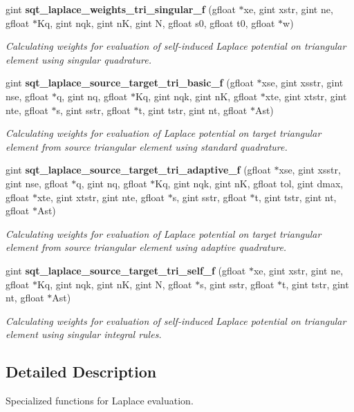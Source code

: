 \begin{DoxyCompactItemize}
gint {\bf sqt\+\_\+laplace\+\_\+weights\+\_\+tri\+\_\+singular\+\_\+f} (gfloat $\ast$xe, gint xstr, gint ne, gfloat $\ast$Kq, gint nqk, gint n\+K, gint N, gfloat s0, gfloat t0, gfloat $\ast$w)
\begin{DoxyCompactList}\small\item\em Calculating weights for evaluation of self-\/induced Laplace potential on triangular element using singular quadrature. \end{DoxyCompactList}\item 
gint {\bf sqt\+\_\+laplace\+\_\+source\+\_\+target\+\_\+tri\+\_\+basic\+\_\+f} (gfloat $\ast$xse, gint xsstr, gint nse, gfloat $\ast$q, gint nq, gfloat $\ast$Kq, gint nqk, gint n\+K, gfloat $\ast$xte, gint xtstr, gint nte, gfloat $\ast$s, gint sstr, gfloat $\ast$t, gint tstr, gint nt, gfloat $\ast$Ast)
\begin{DoxyCompactList}\small\item\em Calculating weights for evaluation of Laplace potential on target triangular element from source triangular element using standard quadrature. \end{DoxyCompactList}\item 
gint {\bf sqt\+\_\+laplace\+\_\+source\+\_\+target\+\_\+tri\+\_\+adaptive\+\_\+f} (gfloat $\ast$xse, gint xsstr, gint nse, gfloat $\ast$q, gint nq, gfloat $\ast$Kq, gint nqk, gint n\+K, gfloat tol, gint dmax, gfloat $\ast$xte, gint xtstr, gint nte, gfloat $\ast$s, gint sstr, gfloat $\ast$t, gint tstr, gint nt, gfloat $\ast$Ast)
\begin{DoxyCompactList}\small\item\em Calculating weights for evaluation of Laplace potential on target triangular element from source triangular element using adaptive quadrature. \end{DoxyCompactList}\item 
gint {\bf sqt\+\_\+laplace\+\_\+source\+\_\+target\+\_\+tri\+\_\+self\+\_\+f} (gfloat $\ast$xe, gint xstr, gint ne, gfloat $\ast$Kq, gint nqk, gint n\+K, gint N, gfloat $\ast$s, gint sstr, gfloat $\ast$t, gint tstr, gint nt, gfloat $\ast$Ast)
\begin{DoxyCompactList}\small\item\em Calculating weights for evaluation of self-\/induced Laplace potential on triangular element using singular integral rules. \end{DoxyCompactList}\end{DoxyCompactItemize}


\subsection{Detailed Description}
Specialized functions for Laplace evaluation. 



